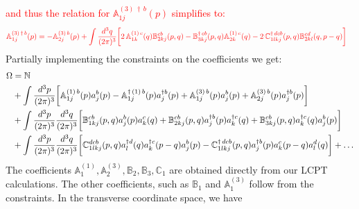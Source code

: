 \documentclass[aps,prd,amsmath,amssymb,nofootinbib]{revtex4-2}
\def\mf#1{\mathbb{#1}}
\numberwithin{equation}{section}
\begin{document}
\textcolor{red}{and thus
the relation for $\mf{A}^{(3)\, \dagger\, b}_{1j}(p)$ simplifies to:}
\begin{align}
 \color{red}\mf{A}^{(3)\, \dagger\, b}_{1j}(p) & \color{red}= -\mf{A}^{(3)\, b}_{2j}(p) +\int \frac{d^{3}q}{(2\pi)^{3}}\bigg[2\, \mf{A}^{(1)\, c}_{1k}(q)\mf{B}^{cb}_{2kj}(p,q)-\mf{B}^{\dagger\, cb}_{3kj}(p,q)\mf{A}^{(1)\,c}_{2k}(q)-2\,\mf{C}^{\dagger\, dcb}_{1lkj}(p,q)\mf{B}^{cd}_{2kl}(q,p-q)\bigg]
 \end{align}
 Partially implementing the constraints on the coefficients we get:
\begin{align}
    \Omega  & = \mf{N}  \notag \\ & +
                \int \frac{d^3p}{(2\pi)^3} 
                \bigg[ 
                   \mf{A}^{(1)\, b}_{1j}(p)a^{b}_{j}(p) 
                -  \mf{A}^{\dagger\, (1)\, b}_{1j} (p) a^{\dagger b}_{j}(p)+ \mf{A}^{(3)\, b}_{1j}(p)a^{b}_{j}(p) 
                +  \mf{A}^{(3)\, b}_{2j} (p) a^{\dagger b}_{j}(p)\bigg] \notag \\ & 
               +\int \frac{d^3p}{(2\pi)^3} \frac{d^3q}{(2\pi)^3} 
               \bigg[\mf{B}^{cb}_{1kj}(p,q) a^{b}_{j}(p)a^{c}_{k}(q) 
                   + \mf{B}^{cb}_{2kj}(p,q) a^{\dagger b}_{j}(p)a^{\dagger c}_{k}(q)
               + \mf{B}^{cb}_{3kj} (p,q) a^{\dagger c}_{k}(q)a^{b}_{j}(p)
               \bigg] \notag \\ & 
               + \int 
               \frac{d^3p}{(2\pi)^3} \frac{d^3q}{(2\pi)^3} 
               \bigg[
                \mf{C}^{ dcb}_{1lkj}(p,q) a^{\dagger d}_{l}(q)  a^{\dagger c}_{k}(p-q)  a^{b}_{j}(p)
               - \mf{C}^{\dagger\, dcb}_{1lkj}(p,q) a^{\dagger b}_{j}(p) a^{c}_{k}(p-q) a^{d}_{l}(q)\bigg] +\ldots
\end{align}
The coefficients $\mf{A}^{(1)}_{1}, \mf{A}^{(3)}_{2}, \mf{B}_{2}, \mf{B}_{3}, \mf{C}_{1}$ are obtained directly from our LCPT calculations. The other coefficients, such as $\mf{B}_{1}$ and $\mf{A}^{(3)}_{1}$ follow from the constraints. In the transverse coordinate space, we have
\end{document}

